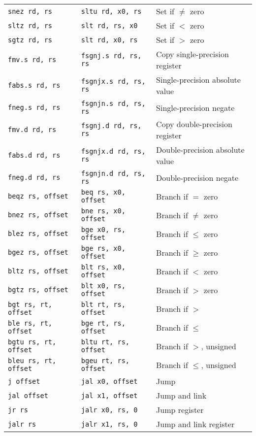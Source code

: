 \begin{tabular}{l l l}
{\tt snez rd, rs} & {\tt sltu rd, x0, rs} & Set if $\neq$ zero \\
{\tt sltz rd, rs} & {\tt slt rd, rs, x0} & Set if $<$ zero \\
{\tt sgtz rd, rs} & {\tt slt rd, x0, rs} & Set if $>$ zero \\
\hline
{\tt fmv.s rd, rs} & {\tt fsgnj.s rd, rs, rs} & Copy single-precision register \\
{\tt fabs.s rd, rs} & {\tt fsgnjx.s rd, rs, rs} & Single-precision absolute value \\
{\tt fneg.s rd, rs} & {\tt fsgnjn.s rd, rs, rs} & Single-precision negate \\
{\tt fmv.d rd, rs} & {\tt fsgnj.d rd, rs, rs} & Copy double-precision register \\
{\tt fabs.d rd, rs} & {\tt fsgnjx.d rd, rs, rs} & Double-precision absolute value \\
{\tt fneg.d rd, rs} & {\tt fsgnjn.d rd, rs, rs} & Double-precision negate \\
\hline
{\tt beqz rs, offset} & {\tt beq rs, x0, offset} & Branch if $=$ zero \\
{\tt bnez rs, offset} & {\tt bne rs, x0, offset} & Branch if $\neq$ zero \\
{\tt blez rs, offset} & {\tt bge x0, rs, offset} & Branch if $\leq$ zero \\
{\tt bgez rs, offset} & {\tt bge rs, x0, offset} & Branch if $\geq$ zero \\
{\tt bltz rs, offset} & {\tt blt rs, x0, offset} & Branch if $<$ zero \\
{\tt bgtz rs, offset} & {\tt blt x0, rs, offset} & Branch if $>$ zero \\
\hline
{\tt bgt rs, rt, offset} & {\tt blt rt, rs, offset} & Branch if $>$ \\
{\tt ble rs, rt, offset} & {\tt bge rt, rs, offset} & Branch if $\leq$ \\
{\tt bgtu rs, rt, offset} & {\tt bltu rt, rs, offset} & Branch if $>$, unsigned \\
{\tt bleu rs, rt, offset} & {\tt bgeu rt, rs, offset} & Branch if $\leq$, unsigned \\
\hline
{\tt j offset} & {\tt jal x0, offset} & Jump \\
{\tt jal offset} & {\tt jal x1, offset} & Jump and link \\
{\tt jr rs} & {\tt jalr x0, rs, 0} & Jump register \\
{\tt jalr rs} & {\tt jalr x1, rs, 0} & Jump and link register \\

\end{tabular}
